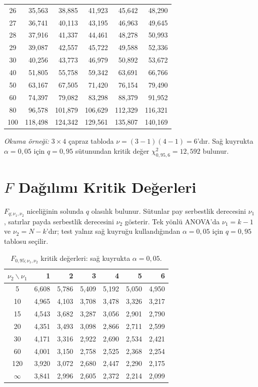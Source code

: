 \begin{center}
{\begin{tabular}{c*{5}{r}}
26 & 35,563 & 38,885 & 41,923 & 45,642 & 48,290 \\
27 & 36,741 & 40,113 & 43,195 & 46,963 & 49,645 \\
28 & 37,916 & 41,337 & 44,461 & 48,278 & 50,993 \\
29 & 39,087 & 42,557 & 45,722 & 49,588 & 52,336 \\
30 & 40,256 & 43,773 & 46,979 & 50,892 & 53,672 \\
40 & 51,805 & 55,758 & 59,342 & 63,691 & 66,766 \\
50 & 63,167 & 67,505 & 71,420 & 76,154 & 79,490 \\
60 & 74,397 & 79,082 & 83,298 & 88,379 & 91,952 \\
80 & 96,578 & 101,879 & 106,629 & 112,329 & 116,321 \\
100 & 118,498 & 124,342 & 129,561 & 135,807 & 140,169 \\
\bottomrule
\end{tabular}
}
\end{center}

\textit{Okuma örneği:} $3\times4$ çapraz tabloda
$\nu=(3-1)(4-1)=6$'dır. Sağ kuyrukta $\alpha=0{,}05$ için $q=0{,}95$
sütunundan kritik değer $\chi^2_{0{,}95,6}=12{,}592$ bulunur.

\ifimoders\else
\clearpage
\section[F Dağılımı Kritik Değerleri]{$F$ Dağılımı Kritik Değerleri}
\label{sec:f-table}

$F_{q;\nu_1,\nu_2}$ niceliğinin solunda $q$ olasılık bulunur. Sütunlar pay
serbestlik derecesini $\nu_1$, satırlar payda serbestlik derecesini $\nu_2$
gösterir. Tek yönlü ANOVA'da $\nu_1=k-1$ ve $\nu_2=N-k$'dır; test yalnız sağ
kuyruğu kullandığından $\alpha=0{,}05$ için $q=0{,}95$ tablosu seçilir.

\begin{table}[H]
\centering
\caption{$F_{0{,}95;\nu_1,\nu_2}$ kritik değerleri: sağ kuyrukta $\alpha=0{,}05$.}
\label{tab:f-critical-05}
\small
\begin{tabular}{crrrrrr}
\toprule
$\nu_2\backslash\nu_1$ & 1 & 2 & 3 & 4 & 5 & 6 \\
\midrule
5   & 6,608 & 5,786 & 5,409 & 5,192 & 5,050 & 4,950 \\
10  & 4,965 & 4,103 & 3,708 & 3,478 & 3,326 & 3,217 \\
15  & 4,543 & 3,682 & 3,287 & 3,056 & 2,901 & 2,790 \\
20  & 4,351 & 3,493 & 3,098 & 2,866 & 2,711 & 2,599 \\
30  & 4,171 & 3,316 & 2,922 & 2,690 & 2,534 & 2,421 \\
60  & 4,001 & 3,150 & 2,758 & 2,525 & 2,368 & 2,254 \\
120 & 3,920 & 3,072 & 2,680 & 2,447 & 2,290 & 2,175 \\
$\infty$ & 3,841 & 2,996 & 2,605 & 2,372 & 2,214 & 2,099 \\
\bottomrule
\end{tabular}
\end{table}

